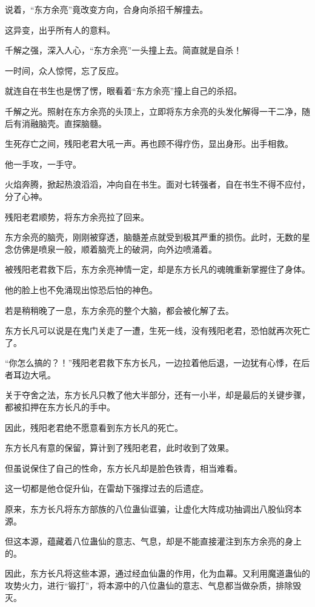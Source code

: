 \begin{this_body}
说着，“东方余亮”竟改变方向，合身向杀招千解撞去。

这异变，出乎所有人的意料。

千解之强，深入人心，“东方余亮”一头撞上去。简直就是自杀！

一时间，众人惊愕，忘了反应。

就连自在书生也是愣了愣，眼看着“东方余亮”撞上自己的杀招。

千解之光。照射在东方余亮的头顶上，立即将东方余亮的头发化解得一干二净，随后有消融脑壳。直探脑髓。

生死存亡之间，残阳老君大吼一声。再也顾不得疗伤，显出身形。出手相救。

他一手攻，一手守。

火焰奔腾，掀起热浪滔滔，冲向自在书生。面对七转强者，自在书生不得不应付，分了心神。

残阳老君顺势，将东方余亮拉了回来。

东方余亮的脑壳，刚刚被穿透，脑髓差点就受到极其严重的损伤。此时，无数的星念仿佛是喷泉一般，顺着脑壳上的破洞，向外边喷涌着。

被残阳老君救下后，东方余亮神情一定，却是东方长凡的魂魄重新掌握住了身体。

他的脸上也不免涌现出惊恐后怕的神色。

若是稍稍晚了一息，东方余亮的整个大脑，都会被化解了去。

东方长凡可以说是在鬼门关走了一遭，生死一线，没有残阳老君，恐怕就再次死亡了。

“你怎么搞的？！”残阳老君救下东方长凡，一边拉着他后退，一边犹有心悸，在后者耳边大吼。

关于夺舍之法，东方长凡只教了他大半部分，还有一小半，却是最后的关键步骤，都被扣押在东方长凡的手中。

因此，残阳老君绝不愿意看到东方长凡的死亡。

东方长凡有意的保留，算计到了残阳老君，此时收到了效果。

但虽说保住了自己的性命，东方长凡却是脸色铁青，相当难看。

这一切都是他仓促升仙，在雷劫下强撑过去的后遗症。

原来，东方长凡将东方部族的八位蛊仙诓骗，让虚化大阵成功抽调出八股仙窍本源。

但这本源，蕴藏着八位蛊仙的意志、气息，却是不能直接灌注到东方余亮的身上的。

因此，东方长凡将这些本源，通过经血仙蛊的作用，化为血幕。又利用魔道蛊仙的攻势火力，进行“锻打”，将本源中的八位蛊仙的意志、气息都当做杂质，排除毁灭。


\end{this_body}
